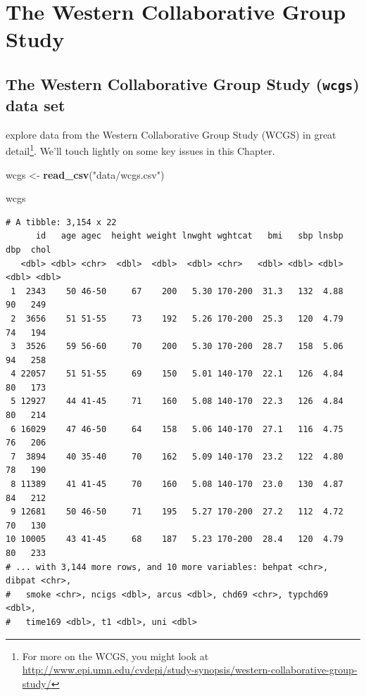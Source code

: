 \documentclass[
]{book}
\newenvironment{Shaded}{\begin{snugshade}}{\end{snugshade}}
\newcommand{\KeywordTok}[1]{\textcolor[rgb]{0.13,0.29,0.53}{\textbf{#1}}}
\newcommand{\NormalTok}[1]{#1}
\newcommand{\StringTok}[1]{\textcolor[rgb]{0.31,0.60,0.02}{#1}}
\begin{document}
\hypertarget{WCGS-Study}{%
\chapter{The Western Collaborative Group Study}\label{WCGS-Study}}

\hypertarget{the-western-collaborative-group-study-wcgs-data-set}{%
\section{\texorpdfstring{The Western Collaborative Group Study (\texttt{wcgs}) data set}{The Western Collaborative Group Study (wcgs) data set}}\label{the-western-collaborative-group-study-wcgs-data-set}}

\citet{Vittinghoff} explore data from the Western Collaborative Group Study (WCGS) in great detail\footnote{For more on the WCGS, you might look at \url{http://www.epi.umn.edu/cvdepi/study-synopsis/western-collaborative-group-study/}}. We'll touch lightly on some key issues in this Chapter.

\begin{Shaded}
\begin{Highlighting}[]
\NormalTok{wcgs <-}\StringTok{ }\KeywordTok{read_csv}\NormalTok{(}\StringTok{"data/wcgs.csv"}\NormalTok{)}

\NormalTok{wcgs}
\end{Highlighting}
\end{Shaded}

\begin{verbatim}
# A tibble: 3,154 x 22
      id   age agec  height weight lnwght wghtcat   bmi   sbp lnsbp   dbp  chol
   <dbl> <dbl> <chr>  <dbl>  <dbl>  <dbl> <chr>   <dbl> <dbl> <dbl> <dbl> <dbl>
 1  2343    50 46-50     67    200   5.30 170-200  31.3   132  4.88    90   249
 2  3656    51 51-55     73    192   5.26 170-200  25.3   120  4.79    74   194
 3  3526    59 56-60     70    200   5.30 170-200  28.7   158  5.06    94   258
 4 22057    51 51-55     69    150   5.01 140-170  22.1   126  4.84    80   173
 5 12927    44 41-45     71    160   5.08 140-170  22.3   126  4.84    80   214
 6 16029    47 46-50     64    158   5.06 140-170  27.1   116  4.75    76   206
 7  3894    40 35-40     70    162   5.09 140-170  23.2   122  4.80    78   190
 8 11389    41 41-45     70    160   5.08 140-170  23.0   130  4.87    84   212
 9 12681    50 46-50     71    195   5.27 170-200  27.2   112  4.72    70   130
10 10005    43 41-45     68    187   5.23 170-200  28.4   120  4.79    80   233
# ... with 3,144 more rows, and 10 more variables: behpat <chr>, dibpat <chr>,
#   smoke <chr>, ncigs <dbl>, arcus <dbl>, chd69 <chr>, typchd69 <dbl>,
#   time169 <dbl>, t1 <dbl>, uni <dbl>
\end{verbatim}
\end{document}
